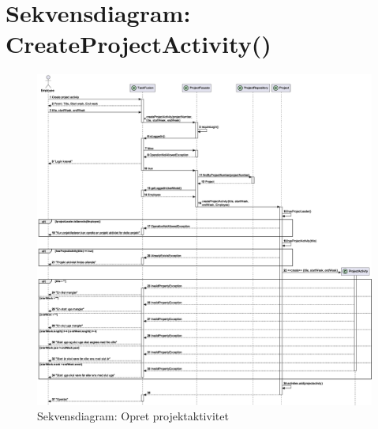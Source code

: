 \section{Sekvensdiagram: CreateProjectActivity()}\label{apdx:seq_create_project_activity}
\begin{figure}[H]
    \centering
    \caption{Sekvensdiagram: Opret projektaktivitet}\label{fig:sequenceCreateProjectActivity}
    \includegraphics[width=\textwidth]{RequirementsAndDesign/SequenceDiagrams/seqCreateProjectActivity.eps}
\end{figure}

